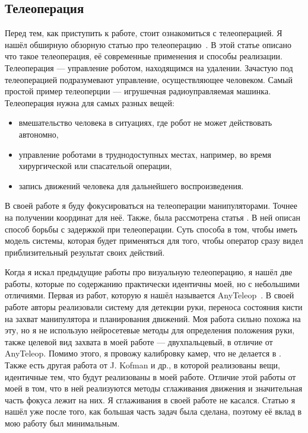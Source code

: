\documentclass[14pt, a4paper]{extarticle}
\begin{document}
\subsection{Телеоперация}
  Перед тем, как приступить к работе, стоит ознакомиться с телеоперацией. Я
  нашёл обширную обзорную статью про телеоперацию~\cite{teleop-survey}. В этой
  статье описано что такое телеоперация, её современные применения и способы
  реализации. Телеоперация --- управление роботом, находящимся на удалении.
  Зачастую под телеоперацией подразумевают управление, осуществляющее
  человеком. Самый простой пример телеоперции --- игрушечная радиоуправляемая
  машинка. Телеоперация нужна для самых разных вещей: 
  \begin{itemize}
    \item вмешательство человека в ситуациях, где робот не может действовать автономно,
    \item управление роботами в труднодоступных местах, например, во время хирургической или спасательой операции,
    \item запись движений человека для дальнейшего воспроизведения.
  \end{itemize}
  В своей работе я буду фокусироваться на телеоперации манипуляторами. Точнее
  на получении координат для неё. Также, была рассмотрена статья
  \cite{model-teleop}. В ней описан способ борьбы с задержкой при
  телеоперации. Суть способа в том, чтобы иметь модель системы, которая будет
  применяться для того, чтобы оператор сразу видел приблизительный результат
  своих действий.

  Когда я искал предыдущие работы про визуальную телеоперацию, я нашёл две
  работы, которые по содержанию практически идентичны моей, но с небольшими
  отличиями. Первая из работ, которую я нашёл называется
  Any\-Te\-le\-op~\cite{anyteleop}. В своей работе авторы реализовали систему для
  детекции руки, переноса состояния кисти на захват манипулятора и планирования
  движений. Моя работа сильно похожа на эту, но я не использую нейросетевые
  методы для определения положения руки, также целевой вид захвата в моей
  работе --- двухпальцевый, в отличие от AnyTeleop. Помимо этого, я провожу
  калибровку камер, что не делается в \cite{anyteleop}. Также есть другая
  работа от J. Kofman и др.\cite{literally-me}, в которой реализованы вещи,
  идентичные тем, что будут реализованы в моей работе. Отличие этой работы от
  моей в том, что в ней реализуются методы сглаживания движения и значительная
  часть фокуса лежит на них. Я сглаживания в своей работе не касался. 
  Статью \cite{literally-me} я нашёл уже после того, как большая часть задач
  была сделана, поэтому её вклад в мою работу был минимальным.
\end{document}
